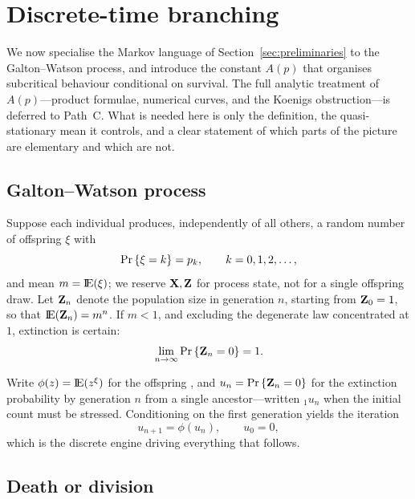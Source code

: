 \section{Discrete-time branching}
\label{sec:discrete-branching}

We now specialise the Markov language of Section~\ref{sec:preliminaries} to the Galton--Watson process, and introduce the constant $A(p)$ that organises subcritical behaviour conditional on survival. The full analytic treatment of $A(p)$---product formulae, numerical curves, and the Koenigs obstruction---is deferred to Path~C. What is needed here is only the definition, the quasi-stationary mean it controls, and a clear statement of which parts of the picture are elementary and which are not.

\subsection{Galton--Watson process}
\label{sec:gw}

Suppose each individual produces, independently of all others, a random number of offspring $\xi$ with
\[
{\text{Pr}\left\{\xi = k\right\}} = p_k,
\qquad
k=0,1,2,\ldots,
\]
and mean $m={\rm I}\!{\rm E}(\xi)$; we reserve ${\bf X},{\bf Z}$ for process state, not for a single offspring draw. Let ${\bf Z}_n$ denote the population size in generation $n$, starting from ${\bf Z}_0=1$, so that ${\rm I}\!{\rm E}({\bf Z}_n)=m^n$. If $m<1$, and excluding the degenerate law concentrated at $1$, extinction is certain:
\[
\lim_{n\to\infty}{\text{Pr}\left\{{\bf Z}_n=0\right\}}=1.
\]

Write $\phi(z)={\rm I}\!{\rm E}(z^{\xi})$ for the offspring \pgf, and $u_n={\text{Pr}\left\{{\bf Z}_n=0\right\}}$ for the extinction probability by generation $n$ from a single ancestor---written ${}_1u_n$ when the initial count must be stressed. Conditioning on the first generation yields the iteration
\begin{equation}
\label{eq:iterPGF}
u_{n+1} = \phi(u_n),
\qquad
u_0=0,
\end{equation}
which is the discrete engine driving everything that follows.

\subsection{Death or division}
\label{sec:death-division}

